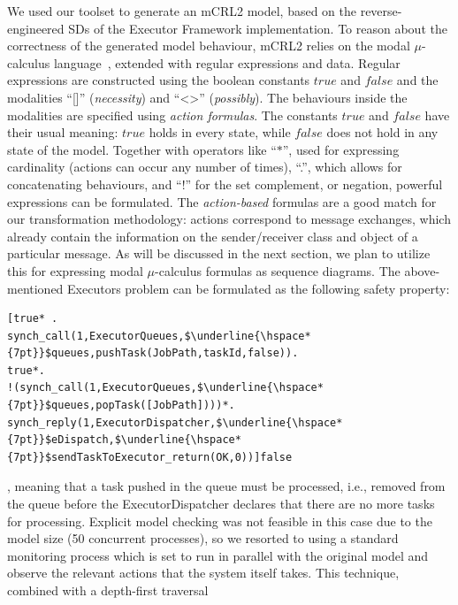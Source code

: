 \documentclass[letter]{llncs}
\begin{document}
We used our toolset to generate an mCRL2 model, based on the reverse-engineered SDs of the Executor Framework implementation. 
To reason about the correctness of the generated model behaviour, mCRL2 relies on
the modal $\mu$-calculus language~\cite{mCRL2}, extended with regular expressions and
data. Regular expressions are constructed using the boolean constants $true$ and $false$ and the modalities
``[]'' (\textit{necessity}) and ``\textless\textgreater'' (\textit{possibly}). 
The behaviours inside the modalities are specified using \emph{action formulas}.
The constants $true$ and $false$
have their usual meaning: $true$ holds in every state, while $false$ does
not hold in any state of the model. 
Together with operators like ``$\ast$'', used for expressing cardinality (actions can occur
any number of times), ``.'', which allows for concatenating behaviours, and ``!'' for the set complement, or negation, powerful expressions can be formulated.
The \emph{action-based} formulas are a good match for our transformation 
methodology: actions correspond to message exchanges, which already contain the information on the sender/receiver class
and object of a particular message. As will be discussed in the next section, we plan to utilize this 
for expressing modal $\mu$-calculus formulas as sequence diagrams.
The above-mentioned Executors problem can be formulated as the following safety property:
\begin{lstlisting}[basicstyle=\sffamily\fontsize{7}{6}\selectfont,showspaces=false,showstringspaces=false,showtabs=false,mathescape]
[true* .
synch_call(1,ExecutorQueues,$\underline{\hspace*{7pt}}$queues,pushTask(JobPath,taskId,false)).
true*.
!(synch_call(1,ExecutorQueues,$\underline{\hspace*{7pt}}$queues,popTask([JobPath])))*.
synch_reply(1,ExecutorDispatcher,$\underline{\hspace*{7pt}}$eDispatch,$\underline{\hspace*{7pt}}$sendTaskToExecutor_return(OK,0))]false 
\end{lstlisting} 
, meaning that a task pushed in the queue must be processed, i.e., removed from the queue before the ExecutorDispatcher
declares that there are no more tasks for processing.
Explicit model checking was not feasible in this case due to the model size (50 concurrent processes),
so we resorted to using a standard monitoring process which is set to run in parallel with the original model 
and observe the relevant actions that the system itself takes. This technique, combined with a depth-first traversal 
\end{document}
